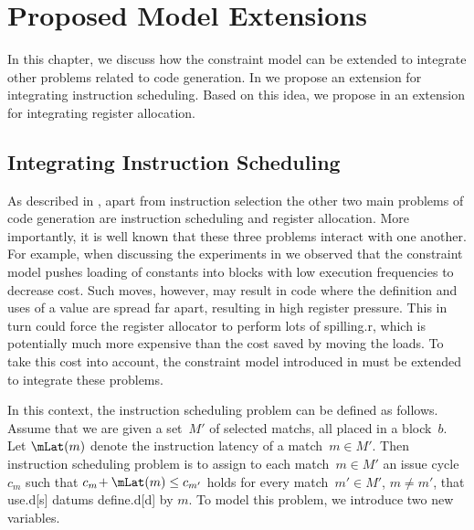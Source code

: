 %

\chapter{Proposed Model Extensions}

In this chapter, we discuss how the \gls{constraint model} can be extended to
integrate other problems related to \gls{code generation}.
%
In  we propose an extension for integrating
\gls{instruction scheduling}.
%
Based on this idea, we propose in  an extension for
integrating \gls{register allocation}.


\section{Integrating Instruction Scheduling}

As described in , apart from \gls{instruction
  selection} the other two main problems of \gls{code generation} are
\gls{instruction scheduling} and \gls{register allocation}.
%
More importantly, it is well known that these three problems interact with one
another.
%
For example, when discussing the experiments in 
we observed that the \gls{constraint model} pushes loading of constants into
\glspl{block} with low execution frequencies to decrease cost.
%
Such moves, however, may result in code where the definition and uses of a value
are spread far apart, resulting in high \gls{register} pressure.
%
This in turn could force the \gls{register allocator} to perform lots of
\gls{spilling.r}, which is potentially much more expensive than the cost saved
by moving the loads.
%
To take this cost into account, the \gls{constraint model} introduced in
 must be extended to integrate these problems.

In this context, the \gls{instruction scheduling} problem can be defined as
follows.
%
Assume that we are given a set~$M'$ of selected \glspl{match}, all placed in a
\gls{block}~$b$\hspace{-1pt}.
%
Let $\mLat(m)$ denote the \gls{instruction} latency of a \gls{match}~\mbox{$m
  \in M'$}.
%
Then \gls{instruction scheduling} problem is to assign to each
\gls{match}~\mbox{$m \in M'$} an issue cycle $c_m$ such that \mbox{$c_m \!+
  \mLat(m) \leq c_{m'}$} holds for every \gls{match}~\mbox{$m' \in M'$},
\mbox{$m \neq m'$}, that \gls{use.d}[s] \glspl{datum} \gls{define.d}[d] by
$m$\hspace{-.8pt}.
%
To model this problem, we introduce two new \glspl{variable}.


